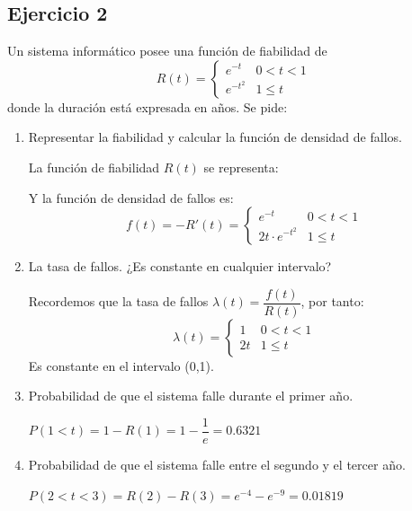 \subsection{Ejercicio 2}
Un sistema informático posee una función de fiabilidad de
\[ R(t)=\begin{cases} 
      e^{-t} & 0<t<1 \\
      e^{-t^2} & 1\leq t 
   \end{cases}
\]
donde la duración está expresada en años. Se pide:
\begin{enumerate}
    \item Representar la fiabilidad y calcular la función de densidad de fallos.
    \begin{tcolorbox}[colback=white,colframe=cyan!50!black,fonttitle=\bfseries]
    La función de fiabilidad $R(t)$ se representa:
    \begin{center}
    \end{center}
    Y la función de densidad de fallos es:
    \[ f(t)=-R'(t)=\begin{cases} 
      e^{-t} & 0<t<1 \\
      2t\cdot e^{-t^2} & 1\leq t 
    \end{cases}
    \]
    \end{tcolorbox}
    \item La tasa de fallos. ¿Es constante en cualquier intervalo?
    \begin{tcolorbox}[colback=white,colframe=cyan!50!black,fonttitle=\bfseries]
    Recordemos que la tasa de fallos $\lambda(t) = \dfrac{f(t)}{R(t)}$, por tanto:
    \[ \lambda(t)=\begin{cases} 
      1 & 0<t<1 \\
      2t & 1\leq t 
    \end{cases}
    \]
    Es constante en el intervalo (0,1).
    \end{tcolorbox}
    \item Probabilidad de que el sistema falle durante el primer año.
    \begin{tcolorbox}[colback=white,colframe=cyan!50!black,fonttitle=\bfseries]
    $P(1<t)=1-R(1)=1-\dfrac{1}{e}= 0.6321$
    \end{tcolorbox}
    \item Probabilidad de que el sistema falle entre el segundo y el tercer año.
    \begin{tcolorbox}[colback=white,colframe=cyan!50!black,fonttitle=\bfseries]
    $P(2<t<3)=R(2)-R(3)=e^{-4}-e^{-9}= 0.01819$
    \end{tcolorbox}
\end{enumerate}

